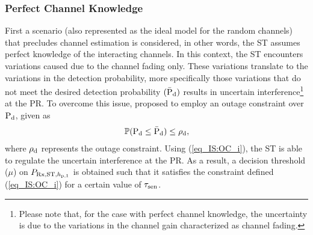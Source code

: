 \subsubsection{Perfect Channel Knowledge}
First a scenario (also represented as the ideal model for the random channels) that precludes channel estimation is considered, in other words, the ST assumes perfect knowledge of the interacting channels. In this context, the ST encounters variations caused due to the channel fading only. These variations translate to the variations in the detection probability, more specifically those variations that do not meet the desired detection probability $(\bar{\text{P}}_{\text{d}})$ results in uncertain interference\footnote{Please note that, for the case with perfect channel knowledge, the uncertainty is due to the variations in the channel gain characterized as channel fading.} at the PR. To overcome this issue, \cite{Juarez11} proposed to employ an outage constraint over $\text{P}_{\text{d}}$, given as
\begin{align}
\mathbb P( \text{P}_{\text{d}} \le \bar{\text{P}}_{\text{d}}) \le \rho_{\text{d}}, \label{eq_IS:OC_i}
\end{align}
where $\rho_{\text{d}}$ represents the outage constraint. Using (\ref{eq_IS:OC_i}), the ST is able to regulate the uncertain interference at the PR. As a result, a decision threshold ($\mu$) on $P_{\text{Rx,ST,$h_{\text{p,1}}$}}$ is obtained such that it satisfies the constraint defined (\ref{eq_IS:OC_i}) for a certain value of $\tau_{\text{sen}}$.

